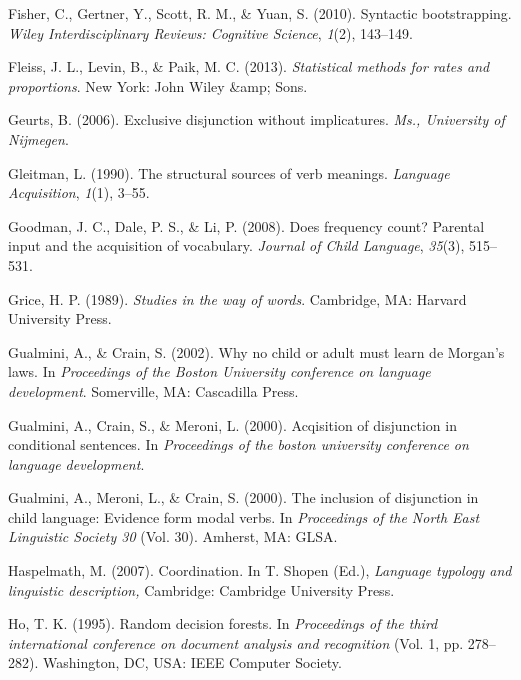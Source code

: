 \documentclass[floatsintext,man]{apa6}
\theoremstyle{definition}
\theoremstyle{definition}
\theoremstyle{definition}
\theoremstyle{remark}
\begin{document}
\hypertarget{ref-fisher2010syntactic}{}
Fisher, C., Gertner, Y., Scott, R. M., \& Yuan, S. (2010). Syntactic
bootstrapping. \emph{Wiley Interdisciplinary Reviews: Cognitive
Science}, \emph{1}(2), 143--149.

\hypertarget{ref-fleiss2013statistical}{}
Fleiss, J. L., Levin, B., \& Paik, M. C. (2013). \emph{Statistical
methods for rates and proportions}. New York: John Wiley \&amp; Sons.

\hypertarget{ref-geurts2006exclusive}{}
Geurts, B. (2006). Exclusive disjunction without implicatures.
\emph{Ms., University of Nijmegen}.

\hypertarget{ref-gleitman1990structural}{}
Gleitman, L. (1990). The structural sources of verb meanings.
\emph{Language Acquisition}, \emph{1}(1), 3--55.

\hypertarget{ref-goodman2008does}{}
Goodman, J. C., Dale, P. S., \& Li, P. (2008). Does frequency count?
Parental input and the acquisition of vocabulary. \emph{Journal of Child
Language}, \emph{35}(3), 515--531.

\hypertarget{ref-grice1989studies}{}
Grice, H. P. (1989). \emph{Studies in the way of words}. Cambridge, MA:
Harvard University Press.

\hypertarget{ref-gualminicrain2002}{}
Gualmini, A., \& Crain, S. (2002). Why no child or adult must learn de
Morgan's laws. In \emph{Proceedings of the Boston University conference
on language development}. Somerville, MA: Cascadilla Press.

\hypertarget{ref-gualmini2000}{}
Gualmini, A., Crain, S., \& Meroni, L. (2000). Acqisition of disjunction
in conditional sentences. In \emph{Proceedings of the boston university
conference on language development}.

\hypertarget{ref-gualmini2000inclusion}{}
Gualmini, A., Meroni, L., \& Crain, S. (2000). The inclusion of
disjunction in child language: Evidence form modal verbs. In
\emph{Proceedings of the North East Linguistic Society 30} (Vol. 30).
Amherst, MA: GLSA.

\hypertarget{ref-haspelmath2007}{}
Haspelmath, M. (2007). Coordination. In T. Shopen (Ed.), \emph{Language
typology and linguistic description,} Cambridge: Cambridge University
Press.

\hypertarget{ref-ho1995random}{}
Ho, T. K. (1995). Random decision forests. In \emph{Proceedings of the
third international conference on document analysis and recognition}
(Vol. 1, pp. 278--282). Washington, DC, USA: IEEE Computer Society.
\end{document}
